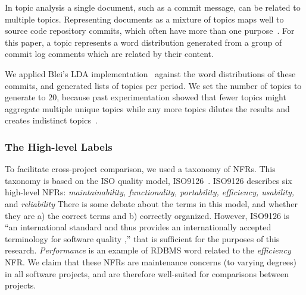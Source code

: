 \documentclass[smallextended]{svjour3}       %
\begin{document}
In topic analysis a single document, such as a commit message, can be related to multiple topics. 
Representing documents as a mixture of topics maps well to source code repository commits, which often have more than one purpose~\cite{Hindle09ICSM}.  
For this paper, a topic represents a word distribution generated from a group of commit log comments which are related by their content.  

We applied Blei's LDA implementation~\cite{Blei2003} against the word distributions of these commits, and generated lists of topics per period. 
We set the number of topics to generate to $20$, because past experimentation showed that fewer topics might aggregate multiple unique topics while
any more topics dilutes the results and creates indistinct topics~\cite{Hindle09ICSM}. 

\subsubsection{The High-level Labels}


To facilitate cross-project comparison, we used a taxonomy of NFRs. This taxonomy is based on the ISO quality model, ISO9126~\cite{iso9126}. 
ISO9126 describes six high-level NFRs: \emph{maintainability, functionality,
portability, efficiency, usability,} and \emph{reliability}
There is some debate about the terms in this model, and whether they are a) the correct terms and b) correctly organized. 
However, ISO9126 is ``an international standard and thus provides an 
internationally accepted terminology for software quality
\cite[p. 58]{Boegh2008},'' that is sufficient for the purposes of this
research.  
\emph{Performance} is an example of RDBMS word related to the \emph{efficiency} NFR.
We claim that these NFRs are maintenance concerns (to varying degrees) in all software projects, and are therefore well-suited for comparisons between
projects.

\end{document}
